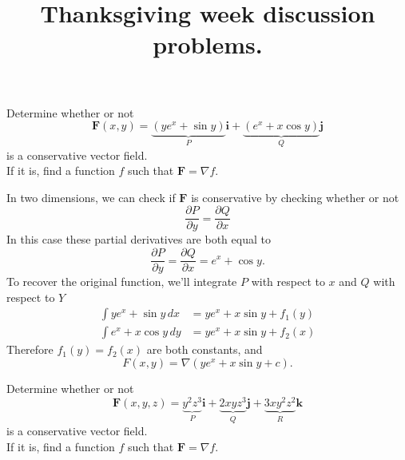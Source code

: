 \documentclass{article}
\newenvironment{problem}[2][Problem]{\begin{trivlist}
\item[\hskip \labelsep {\bfseries #1}\hskip \labelsep {\bfseries #2.}]}{\end{trivlist}}
\newenvironment{solution}[1][Solution.]{\begin{trivlist}
\item[\hskip \labelsep {\bfseries #1}]}{\end{trivlist}}
\begin{document}
\title{Thanksgiving week discussion problems.}
\date{}

\maketitle

\begin{problem}{13.3.7}
  Determine whether or not \[
    \mathbf F(x,y) = \underbrace{(ye^x + \sin y)}_P\mathbf i + \underbrace{(e^x + x\cos y)}_Q\mathbf j
  \] is a conservative vector field.
  \\
  If it is, find a function $f$ such that $\mathbf F = \nabla f$.
\end{problem}

\begin{solution} $ $\\
  In two dimensions, we can check if $\mathbf F$ is conservative by checking
  whether or not \[
    \frac{\partial P}{\partial y} = \frac{\partial Q}{\partial x}
  \]
  In this case these partial derivatives are both equal to \[
    \frac{\partial P}{\partial y} = \frac{\partial Q}{\partial x} = e^x + \cos y.
  \]
  To recover the original function, we'll integrate $P$ with respect to $x$
  and $Q$ with respect to $Y$ \begin{align*}
    \int ye^x + \sin y\,dx &= ye^x + x\sin y + f_1(y)\\
    \int e^x + x\cos y\,dy &= ye^x + x\sin y + f_2(x)
  \end{align*}
  Therefore $f_1(y) = f_2(x)$ are both constants, and \[
    F(x,y) = \nabla(ye^x + x\sin y + c).
  \]
\end{solution}
\pagebreak
\begin{problem}{13.5.11}
  Determine whether or not \[
    \mathbf F(x,y,z)
      = \underbrace{y^2z^3}_P\mathbf i
      + \underbrace{2xyz^3}_Q\mathbf j
      + \underbrace{3xy^2z^2}_R\mathbf k
  \] is a conservative vector field.
  \\
  If it is, find a function $f$ such that $\mathbf F = \nabla f$.
\end{problem}
\end{document}
